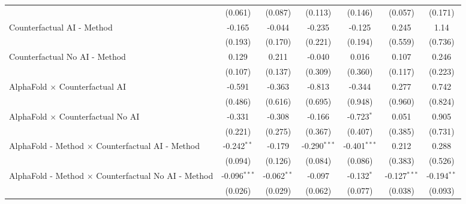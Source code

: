 \begin{tabular}{lcccccc}
                                                              & (0.061)        & (0.087)       & (0.113)        & (0.146)        & (0.057)        & (0.171)\\   
   Counterfactual AI - Method                                 & -0.165         & -0.044        & -0.235         & -0.125         & 0.245          & 1.14\\   
                                                              & (0.193)        & (0.170)       & (0.221)        & (0.194)        & (0.559)        & (0.736)\\   
   Counterfactual No AI - Method                              & 0.129          & 0.211         & -0.040         & 0.016          & 0.107          & 0.246\\   
                                                              & (0.107)        & (0.137)       & (0.309)        & (0.360)        & (0.117)        & (0.223)\\   
   AlphaFold $\times$ Counterfactual AI                       & -0.591         & -0.363        & -0.813         & -0.344         & 0.277          & 0.742\\   
                                                              & (0.486)        & (0.616)       & (0.695)        & (0.948)        & (0.960)        & (0.824)\\   
   AlphaFold $\times$ Counterfactual No AI                    & -0.331         & -0.308        & -0.166         & -0.723$^{*}$   & 0.051          & 0.905\\   
                                                              & (0.221)        & (0.275)       & (0.367)        & (0.407)        & (0.385)        & (0.731)\\   
   AlphaFold - Method $\times$ Counterfactual AI - Method     & -0.242$^{**}$  & -0.179        & -0.290$^{***}$ & -0.401$^{***}$ & 0.212          & 0.288\\   
                                                              & (0.094)        & (0.126)       & (0.084)        & (0.086)        & (0.383)        & (0.526)\\   
   AlphaFold - Method $\times$ Counterfactual No AI - Method  & -0.096$^{***}$ & -0.062$^{**}$ & -0.097         & -0.132$^{*}$   & -0.127$^{***}$ & -0.194$^{**}$\\   
                                                              & (0.026)        & (0.029)       & (0.062)        & (0.077)        & (0.038)        & (0.093)\\   

\end{tabular}
